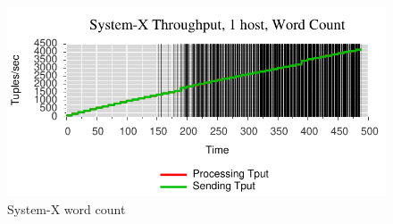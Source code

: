 \begin{figure}[t]
\centering
\includegraphics[width=1\linewidth]{figures/sb1_tput.pdf}
\caption{System-X word count}
\label{fig:label-me-if-you-want}
\end{figure}

